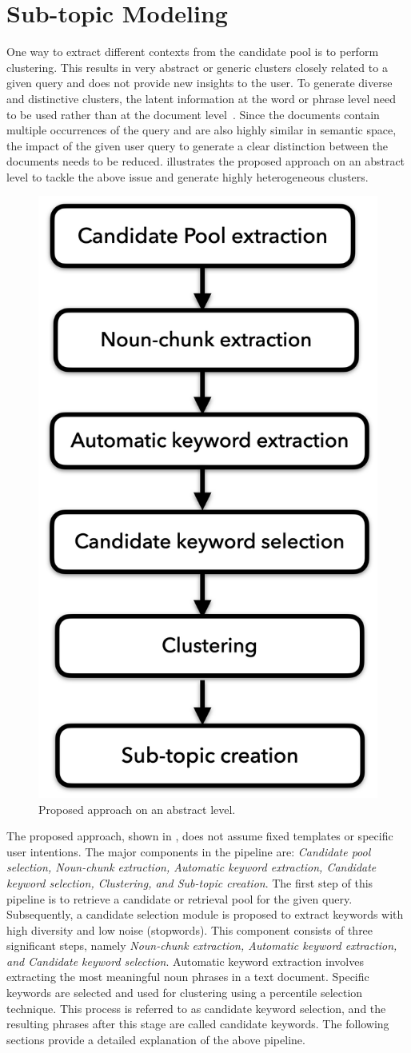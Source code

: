 
\chapter{Sub-topic Modeling}

One way to extract different contexts from the candidate pool is to perform clustering. This results in very abstract or generic clusters closely related to a given query and does not provide new insights to the user. To generate diverse and distinctive clusters, the latent information at the word or phrase level need to be used rather than at the document level~\cite{blei2003latent}. Since the documents contain multiple occurrences of the query and are also highly similar in semantic space, the impact of the given user query to generate a clear distinction between the documents needs to be reduced.  illustrates the proposed approach on an abstract level to tackle the above issue and generate highly heterogeneous clusters.


\begin{figure}[h]
	\centering
	\includegraphics[width=.35\textwidth]{images/thesis_images/methodology.png}
	\caption{Proposed approach on an abstract level. \label{fig:methodology2}}
\end{figure}

The proposed approach, shown in , does not assume fixed templates or specific user intentions. The major components in the pipeline are: \emph{Candidate pool selection, Noun-chunk extraction, Automatic keyword extraction, Candidate keyword selection, Clustering, and Sub-topic creation}. The first step of this pipeline is to retrieve a candidate or retrieval pool for the given query. Subsequently, a candidate selection module is proposed to extract keywords with high diversity and low noise (stopwords). This component consists of three significant steps, namely \emph{Noun-chunk extraction, Automatic keyword extraction, and Candidate keyword selection}. Automatic keyword extraction involves extracting the most meaningful noun phrases in a text document. Specific keywords are selected and used for clustering using a percentile selection technique. This process is referred to as candidate keyword selection, and the resulting phrases after this stage are called candidate keywords. The following sections provide a detailed explanation of the above pipeline.




